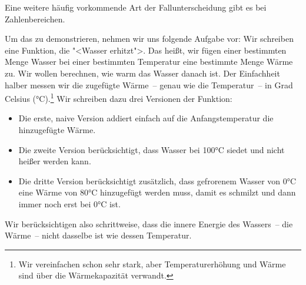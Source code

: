%
Eine weitere häufig vorkommende Art der Fallunterscheidung gibt es bei
Zahlenbereichen.

Um das zu demonstrieren, nehmen wir uns folgende Aufgabe vor: Wir
schreiben eine Funktion, die "<Wasser erhitzt">.
Das heißt, wir fügen einer bestimmten Menge Wasser bei einer
bestimmten Temperatur eine bestimmte Menge Wärme zu.  Wir wollen
berechnen, wie warm das Wasser danach ist.  Der Einfachheit halber
messen wir die zugefügte Wärme~-- genau wie die Temperatur~-- in Grad
Celsius (\si{\degree}C).\footnote{Wir vereinfachen schon sehr stark, aber 
  Temperaturerhöhung und Wärme sind über die Wärmekapazität verwandt.}
Wir schreiben dazu drei Versionen der
Funktion:
%
\begin{itemize}
\item Die erste, naive Version addiert einfach auf die
  Anfangstemperatur die hinzugefügte Wärme.
\item Die zweite Version berücksichtigt, dass Wasser bei 100\si{\degree}C siedet
  und nicht heißer werden kann.
\item Die dritte Version berücksichtigt zusätzlich, dass gefrorenem
  Wasser von 0\si{\degree}C eine Wärme von 80\si{\degree}C hinzugefügt werden muss, damit es
  schmilzt und dann immer noch erst bei 0\si{\degree}C ist.
\end{itemize}
%
Wir berücksichtigen also schrittweise, dass die innere Energie des
Wassers~-- die Wärme~-- nicht dasselbe ist wie dessen Temperatur.

